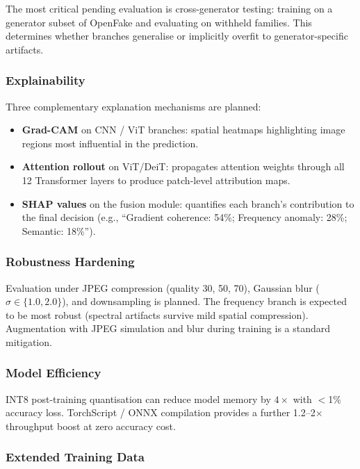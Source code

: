 \documentclass[12pt, a4paper]{article}
\begin{document}
The most critical pending evaluation is cross-generator testing: training on a
generator subset of OpenFake and evaluating on withheld families.  This determines
whether branches generalise or implicitly overfit to generator-specific artifacts.

\subsubsection{Explainability}

Three complementary explanation mechanisms are planned:
\begin{itemize}[leftmargin=*]
  \item \textbf{Grad-CAM} on CNN / ViT branches: spatial heatmaps highlighting
        image regions most influential in the prediction.
  \item \textbf{Attention rollout} on ViT/DeiT: propagates attention weights
        through all 12 Transformer layers to produce patch-level attribution maps.
  \item \textbf{SHAP values} on the fusion module: quantifies each branch's
        contribution to the final decision (e.g., ``Gradient coherence: 54\%;
        Frequency anomaly: 28\%; Semantic: 18\%'').
\end{itemize}

\subsubsection{Robustness Hardening}

Evaluation under JPEG compression (quality 30, 50, 70), Gaussian blur
($\sigma\in\{1.0,2.0\}$), and downsampling is planned.  The frequency branch is
expected to be most robust (spectral artifacts survive mild spatial compression).
Augmentation with JPEG simulation and blur during training is a standard
mitigation.

\subsubsection{Model Efficiency}

INT8 post-training quantisation can reduce model memory by $4\times$ with
$<$1\% accuracy loss.  TorchScript / ONNX compilation provides a further
1.2–2$\times$ throughput boost at zero accuracy cost.

\subsubsection{Extended Training Data}
\end{document}
